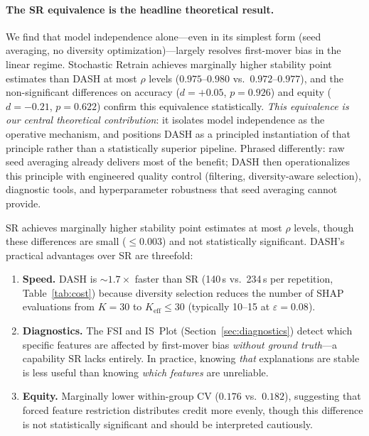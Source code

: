 \documentclass[11pt]{article}
\newcommand{\dash}{\textsc{DASH}}
\newcommand{\rhovar}{\rho}
\begin{document}
\paragraph{The SR equivalence is the headline theoretical result.}
We find that model independence alone---even in its simplest form (seed
averaging, no diversity optimization)---largely resolves first-mover
bias in the linear regime.  Stochastic Retrain achieves marginally
higher stability point estimates than \dash{} at most $\rhovar$ levels
($0.975$--$0.980$ vs.\ $0.972$--$0.977$), and the non-significant
differences on accuracy ($d = +0.05$, $p = 0.926$) and equity
($d = -0.21$, $p = 0.622$) confirm this equivalence statistically.
\emph{This equivalence is our central theoretical contribution}: it
isolates model independence as the operative mechanism, and positions
\dash{} as a principled instantiation of that principle rather than a
statistically superior pipeline.  Phrased differently: raw seed
averaging already delivers most of the benefit; \dash{} then
operationalizes this principle with engineered quality control (filtering,
diversity-aware selection), diagnostic tools, and hyperparameter
robustness that seed averaging cannot provide.

SR achieves marginally higher stability point estimates at most
$\rhovar$ levels, though these differences are small ($\leq 0.003$) and
not statistically significant.  \dash{}'s practical advantages over SR
are threefold:
\begin{enumerate}
  \item \textbf{Speed.} \dash{} is ${\sim}1.7\times$ faster than SR (140\,s
    vs.\ 234\,s per repetition, Table~\ref{tab:cost}) because diversity
    selection reduces the number of SHAP evaluations from $K = 30$ to
    $K_{\text{eff}} \leq 30$ (typically 10--15 at $\varepsilon = 0.08$).
  \item \textbf{Diagnostics.} The FSI and IS~Plot
    (Section~\ref{sec:diagnostics}) detect which specific features are
    affected by first-mover bias \emph{without ground truth}---a
    capability SR lacks entirely. In practice, knowing \emph{that}
    explanations are stable is less useful than knowing \emph{which
    features} are unreliable.
  \item \textbf{Equity.} Marginally lower within-group CV ($0.176$
    vs.\ $0.182$), suggesting that forced feature restriction
    distributes credit more evenly, though this difference is not
    statistically significant and should be interpreted cautiously.
\end{enumerate}
\end{document}
